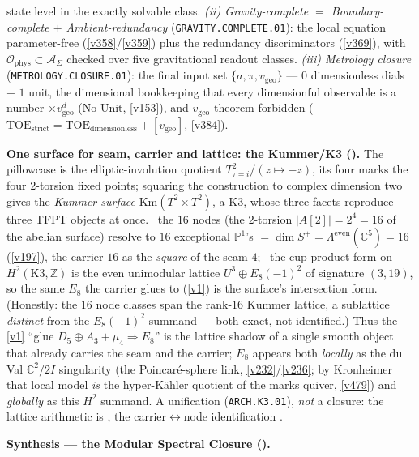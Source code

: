 \documentclass[11pt,a4paper]{article}
\newcommand{\Z}{\mathbb Z}
\begin{document}
\begin{keybox}
state level in the exactly solvable class.
\emph{(ii) Gravity-complete $=$ Boundary-complete $+$ Ambient-redundancy} (\texttt{GRAVITY.COMPLETE.01}): the local
equation parameter-free (\vref{v358}/\vref{v359}) plus the redundancy discriminators (\vref{v369}), with
$\mathcal O_{\mathrm{phys}}\subset\mathcal A_\Sigma$ checked over five gravitational readout classes.
\emph{(iii) Metrology closure} (\texttt{METROLOGY.CLOSURE.01}): the final input set $\{a,\pi,v_{\mathrm{geo}}\}$ ---
$0$ dimensionless dials $+$ $1$ unit, the dimensional bookkeeping that every dimensionful observable is a number
$\times v_{\mathrm{geo}}^d$ (No-Unit, \vref{v153}), and $v_{\mathrm{geo}}$ theorem-forbidden
($\mathrm{TOE}_{\mathrm{strict}}{=}\mathrm{TOE}_{\mathrm{dimensionless}}{+}[v_{\mathrm{geo}}]$, \vref{v384}).
\par\smallskip\noindent\textbf{One surface for seam, carrier and lattice: the Kummer/K3
().} The pillowcase is the elliptic-involution quotient
$T^2_{\tau=i}/(z{\mapsto}{-}z)$, its four marks the four $2$-torsion fixed points; squaring the construction
to complex dimension two gives the \emph{Kummer surface} $\mathrm{Km}(T^2{\times}T^2)$, a K3, whose three
facets reproduce three TFPT objects at once. \mE\ the $16$ nodes (the $2$-torsion $|A[2]|{=}2^4{=}16$ of the
abelian surface) resolve to $16$ exceptional $\mathbb P^1$'s $=\dim S^+=\Lambda^{\mathrm{even}}(\mathbb
C^5)=16$ (\vref{v197}), the carrier-$16$ as the \emph{square} of the seam-$4$; \mE\ the cup-product form on
$H^2(\mathrm{K3},\Z)$ is the even unimodular lattice $U^3\oplus E_8({-}1)^2$ of signature $(3,19)$, so the
same $E_8$ the carrier glues to (\vref{v1}) is the surface's intersection form. (Honestly: the $16$ node
classes span the rank-$16$ Kummer lattice, a sublattice \emph{distinct} from the $E_8({-}1)^2$ summand ---
both exact, not identified.) Thus the \vref{v1} ``glue $D_5{\oplus}A_3{+}\mu_4{\Rightarrow}E_8$'' is the
lattice shadow of a single smooth object that already carries the seam and the carrier; $E_8$ appears both
\emph{locally} as the du Val $\mathbb C^2/2I$ singularity (the Poincar\'e-sphere link, \vref{v232}/\vref{v236};
by Kronheimer that local model \emph{is} the hyper-K\"ahler quotient of the marks quiver, \vref{v479})
and \emph{globally} as this $H^2$ summand. A unification (\texttt{ARCH.K3.01}), \emph{not} a closure: the
lattice arithmetic is \mE, the carrier$\leftrightarrow$node identification \mC.
\par\smallskip\noindent\textbf{Synthesis --- the Modular Spectral Closure ().}

\end{keybox}
\end{document}

